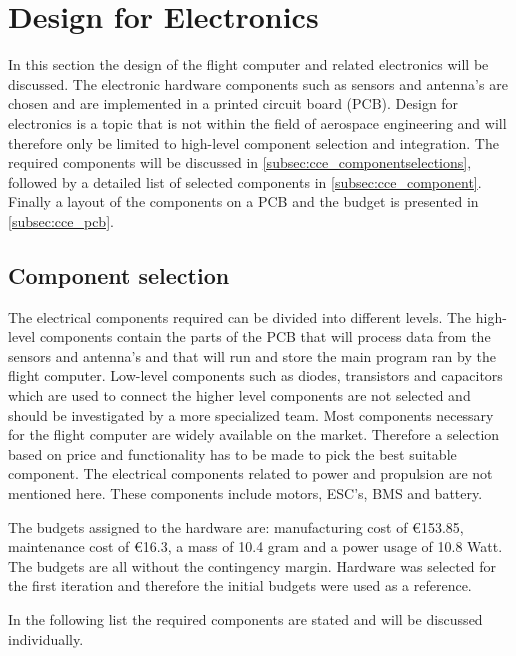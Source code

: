
\section{Design for Electronics}
\label{sec:cce_electronics}
In this section the design of the flight computer and related electronics will be discussed. The electronic hardware components such as sensors and antenna's are chosen and are implemented in a printed circuit board (PCB). Design for electronics is a topic that is not within the field of aerospace engineering and will therefore only be limited to high-level component selection and integration. The required components will be discussed in \autoref{subsec:cce_componentselections}, followed by a detailed list of selected components in \autoref{subsec:cce_component}. Finally a layout of the components on a PCB and the budget is presented in \autoref{subsec:cce_pcb}.


\subsection{Component selection}
\label{subsec:cce_componentselections}
The electrical components required can be divided into different levels. The high-level components contain the parts of the PCB that will process data from the sensors and antenna's and that will run and store the main program ran by the flight computer. Low-level components such as diodes, transistors and capacitors which are used to connect the higher level components are not selected and should be investigated by a more specialized team. Most components necessary for the flight computer are widely available on the market. Therefore a selection based on price and functionality has to be made to pick the best suitable component. The electrical components related to power and propulsion are not mentioned here. These components include motors, ESC's, BMS and battery.

The budgets assigned to the hardware are: manufacturing cost of €153.85, maintenance cost of €16.3, a mass of 10.4 gram and a power usage of 10.8 Watt. The budgets are all without the contingency margin. Hardware was selected for the first iteration and therefore the initial budgets were used as a reference. 

In the following list the required components are stated and will be discussed individually.

